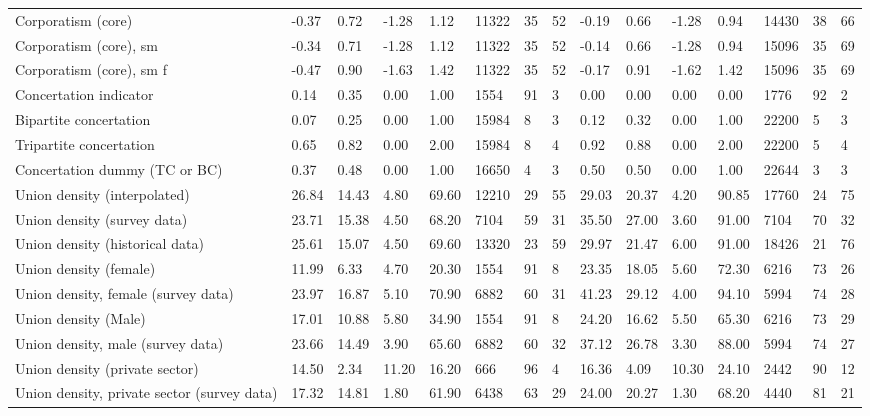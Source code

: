 \begin{longtable}{lllllllllllllll}
Corporatism (core) & -0.37 & 0.72 & -1.28 & 1.12 & 11322 & 35 & 52 & -0.19 & 0.66 & -1.28 & 0.94 & 14430 & 38 & 66\\
\addlinespace
Corporatism (core), sm & -0.34 & 0.71 & -1.28 & 1.12 & 11322 & 35 & 52 & -0.14 & 0.66 & -1.28 & 0.94 & 15096 & 35 & 69\\
Corporatism (core), sm f & -0.47 & 0.90 & -1.63 & 1.42 & 11322 & 35 & 52 & -0.17 & 0.91 & -1.62 & 1.42 & 15096 & 35 & 69\\
Concertation indicator & 0.14 & 0.35 & 0.00 & 1.00 & 1554 & 91 & 3 & 0.00 & 0.00 & 0.00 & 0.00 & 1776 & 92 & 2\\
Bipartite concertation & 0.07 & 0.25 & 0.00 & 1.00 & 15984 & 8 & 3 & 0.12 & 0.32 & 0.00 & 1.00 & 22200 & 5 & 3\\
Tripartite concertation & 0.65 & 0.82 & 0.00 & 2.00 & 15984 & 8 & 4 & 0.92 & 0.88 & 0.00 & 2.00 & 22200 & 5 & 4\\
\addlinespace
Concertation dummy (TC or BC) & 0.37 & 0.48 & 0.00 & 1.00 & 16650 & 4 & 3 & 0.50 & 0.50 & 0.00 & 1.00 & 22644 & 3 & 3\\
Union density (interpolated) & 26.84 & 14.43 & 4.80 & 69.60 & 12210 & 29 & 55 & 29.03 & 20.37 & 4.20 & 90.85 & 17760 & 24 & 75\\
Union density (survey data) & 23.71 & 15.38 & 4.50 & 68.20 & 7104 & 59 & 31 & 35.50 & 27.00 & 3.60 & 91.00 & 7104 & 70 & 32\\
Union density (historical data) & 25.61 & 15.07 & 4.50 & 69.60 & 13320 & 23 & 59 & 29.97 & 21.47 & 6.00 & 91.00 & 18426 & 21 & 76\\
Union density (female) & 11.99 & 6.33 & 4.70 & 20.30 & 1554 & 91 & 8 & 23.35 & 18.05 & 5.60 & 72.30 & 6216 & 73 & 26\\
\addlinespace
Union density, female (survey data) & 23.97 & 16.87 & 5.10 & 70.90 & 6882 & 60 & 31 & 41.23 & 29.12 & 4.00 & 94.10 & 5994 & 74 & 28\\
Union density (Male) & 17.01 & 10.88 & 5.80 & 34.90 & 1554 & 91 & 8 & 24.20 & 16.62 & 5.50 & 65.30 & 6216 & 73 & 29\\
Union density, male (survey data) & 23.66 & 14.49 & 3.90 & 65.60 & 6882 & 60 & 32 & 37.12 & 26.78 & 3.30 & 88.00 & 5994 & 74 & 27\\
Union density (private sector) & 14.50 & 2.34 & 11.20 & 16.20 & 666 & 96 & 4 & 16.36 & 4.09 & 10.30 & 24.10 & 2442 & 90 & 12\\
Union density, private sector (survey data) & 17.32 & 14.81 & 1.80 & 61.90 & 6438 & 63 & 29 & 24.00 & 20.27 & 1.30 & 68.20 & 4440 & 81 & 21\\

\end{longtable}
